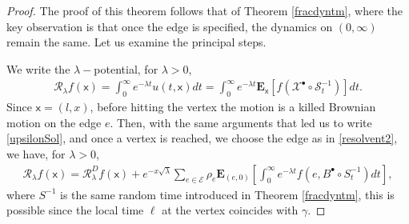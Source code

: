 \documentclass[11pt,a4paper]{article}
\theoremstyle{plain}
\theoremstyle{definition}
\theoremstyle{remark}
\begin{document}
		\begin{proof}
			The proof of this theorem follows that of Theorem \ref{fracdyntm}, where the key observation is that once the edge is specified, the dynamics on $(0,\infty)$ remain the same. Let us examine the principal steps.
			
			We write the $\lambda-$potential, for $\lambda >0$,
			\begin{align*}
				\mathcal{R}_\lambda f(\mathsf{x})=\int_{0}^{\infty} e^{-\lambda t} u(t,\mathsf{x}) dt =\int_{0}^{\infty} e^{-\lambda t} \mathbf{E}_\mathsf{x}[f(\mathcal{X}^\bullet \circ \mathcal{S}^{-1}_t)] dt.
			\end{align*}
			Since $\mathsf{x}=(l,x)$, before hitting the vertex the motion is a killed Brownian motion on the edge $e$. Then, with the same arguments that led us to write \eqref{upsilonSol},  and once a vertex is reached, we choose the edge as in \eqref{resolvent2}, we have, for $\lambda>0$,
			\begin{align}
				\label{resolvent-graph}
				\mathcal{R}_\lambda f(\mathsf{x})=\mathcal{R}_\lambda^D f(\mathsf{x})+ e^{-x \sqrt{\lambda}}  \sum_{e \in \mathcal{E}} \rho_e \mathbf{E}_{(e,0)}  \left[\int_0^\infty e^{-\lambda t} f(e, B^\bullet\circ {S}^{-1}_t) dt\right],
			\end{align}
			where ${S}^{-1}$ is the same random time introduced in Theorem \ref{fracdyntm}, this is possible since the local time $\ell$ at the vertex coincides with $\gamma$.
			

\end{proof}
\end{document}
